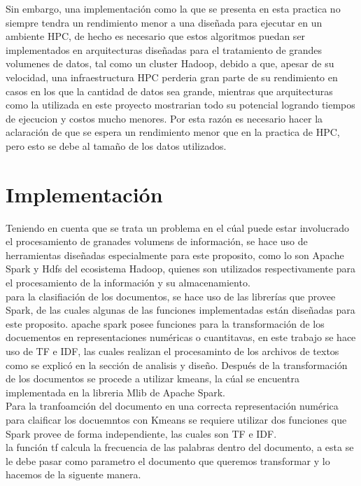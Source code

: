 \documentclass[conference,compsoc]{IEEEtran}
\begin{document}
Sin embargo, una implementación como la que se presenta en esta practica no siempre
tendra un rendimiento menor a una diseñada para ejecutar en un ambiente HPC, de
hecho es necesario que estos algoritmos puedan ser implementados en arquitecturas
diseñadas para el tratamiento de grandes volumenes de datos, tal como un cluster
Hadoop, debido a que, apesar de su velocidad, una infraestructura HPC perderia
gran parte de su rendimiento en casos en los que la cantidad de datos sea grande,
mientras que arquitecturas como la utilizada en este proyecto mostrarian todo
su potencial logrando tiempos de ejecucion y costos mucho menores. Por esta razón
es necesario hacer la aclaración de que se espera un rendimiento menor que en la
practica de HPC, pero esto se debe al tamaño de los datos utilizados.

\section{Implementación}

Teniendo en cuenta que se trata un problema en el cúal puede estar involucrado
el procesamiento de granades volumens de información, se hace uso de
herramientas diseñadas especialmente para este proposito, como lo son Apache
Spark y Hdfs del ecosistema Hadoop, quienes son utilizados respectivamente para
el procesamiento de la información y su almacenamiento.\\

para la clasifiación de los documentos, se hace uso de las librerías que provee
Spark, de las cuales algunas de las funciones implementadas están diseñadas
para este proposito. apache spark posee funciones para la transformación de los
docuementos en representaciones numéricas o cuantitavas, en este trabajo se
hace uso de TF e IDF, las cuales realizan el procesaminto de los archivos de
textos como se explicó en la sección de analisis y diseño. Después de la
transformación de los documentos se procede a utilizar kmeans, la cúal se
encuentra implementada en la libreria Mlib de Apache Spark.\\

Para la tranfoamción del documento en una correcta representación numérica para
claificar los docuemntos con Kmeans se requiere utilizar dos funciones que
Spark provee de forma independiente, las cuales son TF e IDF.\\

la función tf calcula la frecuencia de las palabras dentro del documento, a
esta se le debe pasar como parametro el documento que queremos transformar y lo
hacemos de la siguente manera.\\
\end{document}
